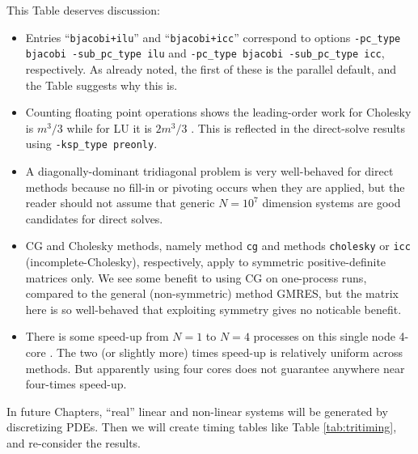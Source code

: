 This Table deserves discussion:
\begin{itemize}
\item Entries ``\texttt{bjacobi+ilu}'' and ``\texttt{bjacobi+icc}'' correspond to options \texttt{-pc\_type bjacobi -sub\_pc\_type ilu} and \texttt{-pc\_type bjacobi -sub\_pc\_type icc}, respectively.  As already noted, the first of these is the parallel default, and the Table suggests why this is.

\item Counting floating point operations shows the leading-order work for Cholesky is $m^3/3$ while for LU it is $2 m^3/3$ \citep{TrefethenBau1997}.  This is reflected in the direct-solve results using \texttt{-ksp\_type preonly}.

\item A diagonally-dominant tridiagonal problem is very well-behaved for direct methods because no fill-in or pivoting occurs when they are applied, but the reader should not assume that generic $N=10^7$ dimension systems are good candidates for direct solves.

\item CG and Cholesky methods, namely \pKSP method \texttt{cg} and \pPC methods \texttt{cholesky} or \texttt{icc} (incomplete-Cholesky), respectively, apply to symmetric positive-definite matrices only.  We see some benefit to using CG on one-process runs, compared to the general (non-symmetric) method GMRES, but the matrix here is so well-behaved that exploiting symmetry gives no noticable benefit.

\item There is some speed-up from $N=1$ to $N=4$ processes on this single node 4-core \WORKSTATION.  The two (or slightly more) times speed-up is relatively uniform across methods.  But apparently using four cores does not guarantee anywhere near four-times speed-up.
\end{itemize}

In future Chapters, ``real'' linear and non-linear systems will be generated by discretizing PDEs.  Then we will create timing tables like Table \ref{tab:tritiming}, and re-consider the results.

